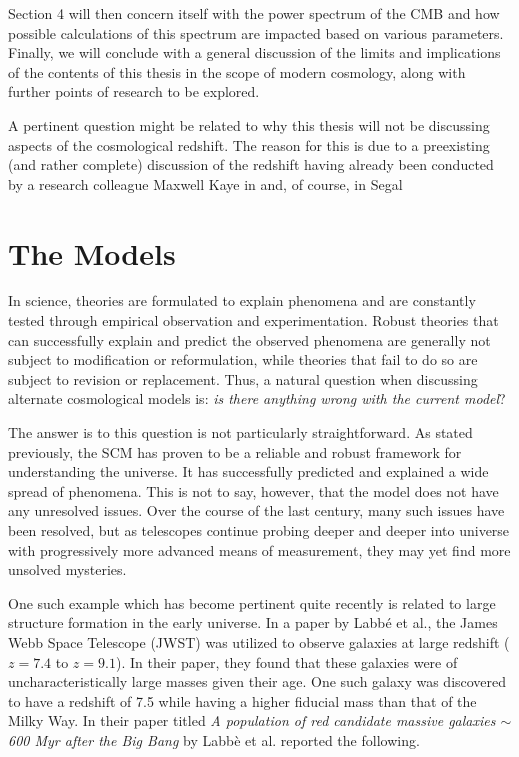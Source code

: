 \documentclass[a4paper]{article}
\begin{document}
    Section 4 will then concern itself with the power spectrum of the CMB and
    how possible calculations of this spectrum are impacted based on various
    parameters. Finally, we will conclude with a general discussion of the
    limits and implications of the contents of this thesis in the scope of
    modern cosmology, along with further points of research to be explored.

    A pertinent question might be related to why this thesis will not be
    discussing aspects of the cosmological redshift. The reason for this is due
    to a preexisting (and rather complete) discussion of the redshift having
    already been conducted by a research colleague Maxwell Kaye in \cite{kaye}
    and, of course, in Segal \cite{segal_b}

    \newpage

    \section{\textbf{The Models}}
    In science, theories are formulated to explain phenomena and are constantly
    tested through empirical observation and experimentation. Robust theories
    that can successfully explain and predict the observed phenomena are
    generally not subject to modification or reformulation, while theories that
    fail to do so are subject to revision or replacement. Thus, a natural
    question when discussing alternate cosmological models is:
    \textit{is there anything wrong with the current model}?

    The answer is to this question is not particularly straightforward. As
    stated previously, the SCM has proven to be a reliable and robust framework
    for understanding the universe. It has successfully predicted and explained
    a wide spread of phenomena. This is not to say, however, that the model
    does not have any unresolved issues. Over the course of the last century,
    many such issues have been resolved, but as telescopes continue probing
    deeper and deeper into universe with progressively more advanced means of
    measurement, they may yet find more unsolved mysteries.

    One such example which has become pertinent quite recently is related to
    large structure formation in the early universe. In a paper by Labb\'{e} et
    al., the James Webb Space Telescope (JWST) was utilized to observe galaxies
    at large redshift ($z=7.4$ to $z=9.1$). In their paper, they found that
    these galaxies were of uncharacteristically large masses given their age.
    One such galaxy was discovered to have a redshift of 7.5 while having a
    higher fiducial mass than that of the Milky Way\cite{labbe}. In their paper titled \textit{A population of red candidate massive galaxies $\sim$600 Myr after
    the Big Bang} by Labb\`{e} et al. reported the following.
\end{document}
